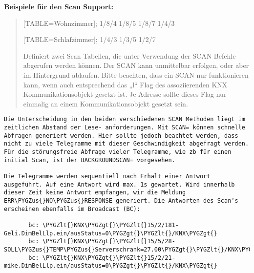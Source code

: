 \documentclass[letterpaper,10pt,english]{sphinxmanual}
\def\PYGZus{\char`\_}
\def\PYGZlt{\char`\<}
\def\PYGZgt{\char`\>}
\begin{document}
\textbf{Beispiele für den Scan Support:}
\begin{quote}

{[}TABLE=Wohnzimmer{]};
1/8/4
1/8/5
1/8/7
1/4/3

{[}TABLE=Schlafzimmer{]};
1/4/3
1/3/5
1/2/7

Definiert zwei Scan Tabellen, die unter Verwendung der SCAN Befehle abgerufen werden können. Der SCAN kann unmittelbar erfolgen, oder aber im Hintergrund ablaufen. Bitte beachten, dass ein SCAN nur funktionieren kann, wenn auch entsprechend das „l“ Flag des assoziierenden KNX Kommunikationsobjekt gesetzt ist. Je Adresse sollte dieses Flag nur einmalig an einem Kommunikationsobjekt gesetzt sein.
\end{quote}

\begin{Verbatim}[commandchars=\\\{\}]
Die Unterscheidung in den beiden verschiedenen SCAN Methoden liegt im zeitlichen Abstand der Lese- anforderungen. Mit SCAN= können schnelle Abfragen generiert werden. Hier sollte jedoch beachtet werden, dass nicht zu viele Telegramme mit dieser Geschwindigkeit abgefragt werden. Für die störungsfreie Abfrage vieler Telegramme, wie zb für einen initial Scan, ist der BACKGROUNDSCAN= vorgesehen.

Die Telegramme werden sequentiell nach Erhalt einer Antwort ausgeführt. Auf eine Antwort wird max. 1s gewartet. Wird innerhalb dieser Zeit keine Antwort empfangen, wir die Meldung ERR\PYGZus{}NO\PYGZus{}RESPONSE generiert. Die Antworten des Scan‘s erscheinen ebenfalls im Broadcast (BC):

       bc: \PYGZlt{}KNX\PYGZgt{}\PYGZlt{}15/2/181-Geli.DimBelLlp.ein/ausStatus=0\PYGZgt{}\PYGZlt{}/KNX\PYGZgt{}
       bc: \PYGZlt{}KNX\PYGZgt{}\PYGZlt{}15/5/28-SOLL\PYGZus{}TEMP\PYGZus{}Serverschrank=27.00\PYGZgt{}\PYGZlt{}/KNX\PYGZgt{}
       bc: \PYGZlt{}KNX\PYGZgt{}\PYGZlt{}15/2/21- mike.DimBelLlp.ein/ausStatus=0\PYGZgt{}\PYGZlt{}/KNX\PYGZgt{}
\end{Verbatim}
\end{document}
